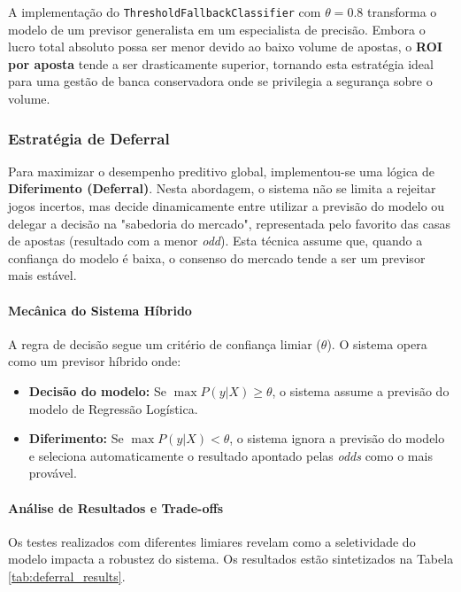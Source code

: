\documentclass[10pt]{article}
\begin{document}
A implementação do \texttt{ThresholdFallbackClassifier} com $\theta = 0.8$ transforma o modelo de um previsor generalista em um especialista de precisão. Embora o lucro total absoluto possa ser menor devido ao baixo volume de apostas, o \textbf{ROI por aposta} tende a ser drasticamente superior, tornando esta estratégia ideal para uma gestão de banca conservadora onde se privilegia a segurança sobre o volume.

\subsubsection{Estratégia de Deferral}

Para maximizar o desempenho preditivo global, implementou-se uma lógica de \textbf{Diferimento (Deferral)}. Nesta abordagem, o sistema não se limita a rejeitar jogos incertos, mas decide dinamicamente entre utilizar a previsão do modelo ou delegar a decisão na "sabedoria do mercado", representada pelo favorito das casas de apostas (resultado com a menor \textit{odd}). Esta técnica assume que, quando a confiança do modelo é baixa, o consenso do mercado tende a ser um previsor mais estável.

\paragraph{Mecânica do Sistema Híbrido}
A regra de decisão segue um critério de confiança limiar ($\theta$). O sistema opera como um previsor híbrido onde:
\begin{itemize}
    \item \textbf{Decisão do modelo:} Se $\max P(y|X) \geq \theta$, o sistema assume a previsão do modelo de Regressão Logística.
    \item \textbf{Diferimento:} Se $\max P(y|X) < \theta$, o sistema ignora a previsão do modelo e seleciona automaticamente o resultado apontado pelas \textit{odds} como o mais provável.
\end{itemize}

\paragraph{Análise de Resultados e Trade-offs}
Os testes realizados com diferentes limiares revelam como a seletividade do modelo impacta a robustez do sistema. Os resultados estão sintetizados na Tabela \ref{tab:deferral_results}.
\end{document}
